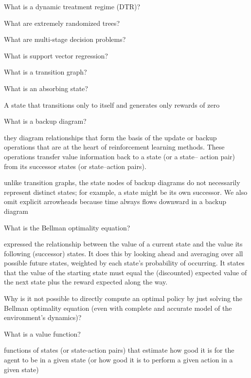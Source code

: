 \documentclass[10pt]{article}
\begin{document}
What is a dynamic treatment regime (DTR)?

\hrulefill

What are extremely randomized trees?

\hrulefill

What are multi-stage decision problems?

\hrulefill

What is support vector regression?

\hrulefill

What is a transition graph?


\hrulefill

What is an absorbing state?

A state that transitions only to itself and generates only rewards of zero

\hrulefill

What is a backup diagram?

they diagram relationships that form the basis of the update or backup operations that are at the heart of reinforcement learning methods. These operations transfer value information back to a state (or a state– action pair) from its successor states (or state–action pairs).

unlike transition graphs, the state nodes of backup diagrams do not necessarily represent distinct states; for example, a state might be its own successor. We also omit explicit arrowheads because time always flows downward in a backup diagram


\hrulefill

What is the Bellman optimality equation?

expressed the relationship between the value of a current state and the value its following (successor) states. It does this by looking ahead and averaging over all possible future states, weighted by each state's probability of occurring. 
It states that the value of the starting state must equal the (discounted) expected value of the next state plus the reward expected along the way.

\hrulefill

Why is it not possible to directly compute an optimal policy by just solving the Bellman optimality equation (even with complete and accurate model of the environment's dynamics)?

\hrulefill

What is a value function?

functions of states (or state-action pairs) that estimate how good it is for the agent to be in a given state (or how good it is to perform a given action in a given state)
\end{document}

